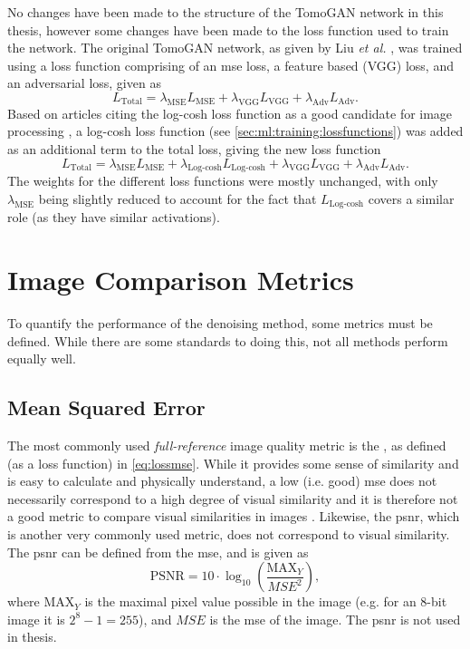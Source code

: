 No changes have been made to the structure of the TomoGAN network in this thesis, however some changes have been made to the loss function used to train the network. The original TomoGAN network, as given by Liu \textit{et al.} \cite{liu2020tomogan}, was trained using a loss function comprising of an \gls{mse} loss, a feature based (VGG) loss, and an adversarial loss, given as 
\begin{equation}
    L_{\text{Total}} = \lambda_{\text{MSE}}L_{\text{MSE}} + \lambda_{\text{VGG}}L_{\text{VGG}} + \lambda_{\text{Adv}}L_{\text{Adv}}.
\end{equation}
Based on articles citing the log-cosh loss function as a good candidate for image processing \cite{7797130,chen2019log}, a log-cosh loss function (see \cref{sec:ml:training:lossfunctions}) was added as an additional term to the total loss, giving the new loss function
\begin{equation}
    L_{\text{Total}} = \lambda_{\text{MSE}}L_{\text{MSE}} + \lambda_{\text{Log-cosh}}L_{\text{Log-cosh}} + \lambda_{\text{VGG}}L_{\text{VGG}} + \lambda_{\text{Adv}}L_{\text{Adv}}.
\end{equation}
The weights for the different loss functions were mostly unchanged, with only $\lambda_\text{MSE}$ being slightly reduced to account for the fact that $L_\text{Log-cosh}$ covers a similar role (as they have similar activations). 

\section{Image Comparison Metrics}
\label{sec:method:metrics}
To quantify the performance of the denoising method, some metrics must be defined. While there are some standards to doing this, not all methods perform equally well. 

\subsection{Mean Squared Error}
\label{sec:method:metrics:mse}
The most commonly used \textit{full-reference} image quality metric is the , as defined (as a loss function) in \cref{eq:lossmse}. While it provides some sense of similarity and is easy to calculate and physically understand, a low (i.e. good) \gls{mse} does not necessarily correspond to a high degree of visual similarity and it is therefore not a good metric to compare visual similarities in images \cite{413502,477498}. Likewise, the \gls{psnr}, which is another very commonly used metric, does not correspond to visual similarity. The \gls{psnr} can be defined from the \gls{mse}, and is given as \cite{477498}
\begin{equation}
    \label{eq:psnr}
    \text{PSNR} = 10 \cdot \log_{10} \left( \frac{\text{MAX}_Y}{MSE^2} \right),
\end{equation}
where $\text{MAX}_Y$ is the maximal pixel value possible in the image (e.g. for an 8-bit image it is $2^8-1=255$), and $MSE$ is the \gls{mse} of the image. The \gls{psnr} is not used in thesis.

